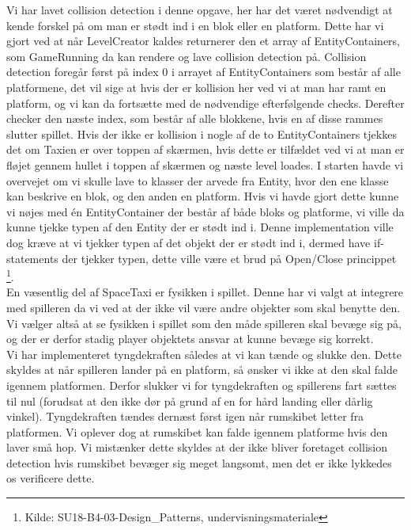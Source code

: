 Vi har lavet collision detection i denne opgave, her har det været nødvendigt at kende forskel på om man er stødt ind i en blok eller en platform. Dette har vi gjort ved at når LevelCreator kaldes returnerer den et array af EntityContainers, som GameRunning da kan rendere og lave collision detection på. Collision detection foregår først på index 0 i arrayet af EntityContainers som består af alle platformene, det vil sige at hvis der er kollision her ved vi at man har ramt en platform, og vi kan da fortsætte med de nødvendige efterfølgende checks. Derefter checker den næste index, som består af alle blokkene, hvis en af disse rammes slutter spillet. Hvis der ikke er kollision i nogle af de to EntityContainers tjekkes det om Taxien er over toppen af skærmen, hvis dette er tilfældet ved vi at man er fløjet gennem hullet i toppen af skærmen og næste level loades. I starten havde vi overvejet om vi skulle lave to klasser der arvede fra Entity, hvor den ene klasse kan beskrive en blok, og den anden en platform. Hvis vi havde gjort dette kunne vi nøjes med én EntityContainer der består af både bloks og platforme, vi ville da kunne tjekke typen af den Entity der er stødt ind i. Denne implementation ville dog kræve at vi tjekker typen af det objekt der er stødt ind i, dermed have if-statements der tjekker typen, dette ville være et brud på Open/Close princippet \footnote{Kilde: SU18-B4-03-Design\_Patterns, undervisningsmateriale}.\\

En væsentlig del af SpaceTaxi er fysikken i spillet. Denne har vi valgt at integrere med spilleren da vi ved at der ikke vil være andre objekter som skal benytte den. Vi vælger altså at se fysikken i spillet som den måde spilleren skal bevæge sig på, og der er derfor stadig player objektets ansvar at kunne bevæge sig korrekt.\\
Vi har implementeret tyngdekraften således at vi kan tænde og slukke den. Dette skyldes at når spilleren lander på en platform, så ønsker vi ikke at den skal falde igennem platformen. Derfor slukker vi for tyngdekraften og spillerens fart sættes til nul (forudsat at den ikke dør på grund af en for hård landing eller dårlig vinkel). Tyngdekraften tændes dernæst først igen når rumskibet letter fra platformen. Vi oplever dog at rumskibet kan falde igennem platforme hvis den laver små hop. Vi mistænker dette skyldes at der ikke bliver foretaget collision detection hvis rumskibet bevæger sig meget langsomt, men det er ikke lykkedes os verificere dette.\\

